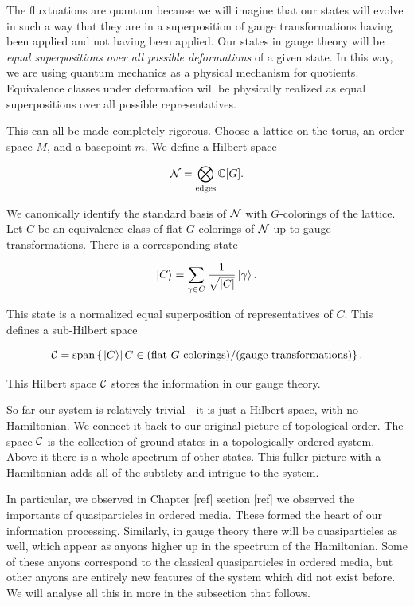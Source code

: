 \documentclass{article}
\theoremstyle{definition}
\numberwithin{figure}{section}
\begin{document}
The fluxtuations are quantum because we will imagine that our states will evolve in such a way that they are in a superposition of gauge transformations having been applied and not having been applied. Our states in gauge theory will be \textit{equal superpositions over all possible deformations} of a given state. In this way, we are using quantum mechanics as a physical mechanism for quotients. Equivalence classes under deformation will be physically realized as equal superpositions over all possible representatives.

This can all be made completely rigorous. Choose a lattice on the torus, an order space $M$, and a basepoint $m$. We define a Hilbert space

$$\mathcal{N}=\bigotimes_{\text{edges}}\mathbb{C}[G].$$

We canonically identify the standard basis of $\mathcal{N}$ with $G$-colorings of the lattice. Let $C$ be an equivalence class of flat $G$-colorings of $\mathcal{N}$ up to gauge transformations. There is a corresponding state

$$\ket{C}=\sum_{\gamma \in C}\frac{1}{\sqrt{|C|}}\ket{\gamma}.$$

This state is a normalized equal superposition of representatives of $C$. This defines a sub-Hilbert space

$$\mathcal{C}=\text{span}\left\{\left.\ket{C}\right| C\in \text{(flat $G$-colorings)}/\text{(gauge transformations)}\right\}.$$

This Hilbert space $\mathcal{C}$ stores the information in our gauge theory.

So far our system is relatively trivial - it is just a Hilbert space, with no Hamiltonian. We connect it back to our original picture of topological order. The space $\mathcal{C}$ is the collection of ground states in a topologically ordered system. Above it there is a whole spectrum of other states. This fuller picture with a Hamiltonian adds all of the subtlety and intrigue to the system.

In particular, we observed in Chapter [ref] section [ref] we observed the importants of quasiparticles in ordered media. These formed the heart of our information processing. Similarly, in gauge theory there will be quasiparticles as well, which appear as anyons higher up in the spectrum of the Hamiltonian. Some of these anyons correspond to the classical quasiparticles in ordered media, but other anyons are entirely new features of the system which did not exist before. We will analyse all this in more in the subsection that follows.
\end{document}
